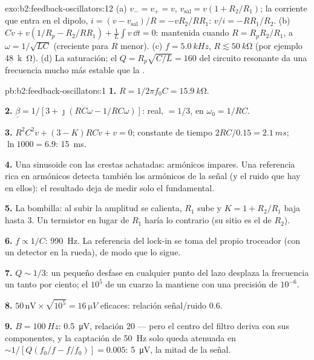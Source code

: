 \begin{solution}{exo:b2:feedback-oscillators:12}
(a) $v_- = v_+ = v$, $v_{\text{sal}} = v(1 + R_2/R_1)$; la corriente que entra en el
dipolo, $i = (v - v_{\text{sal}})/R = -vR_2/RR_1$: $v/i = -RR_1/R_2$. (b) $C\dot v +
v(1/R_p - R_2/RR_1) + \frac1L\int v\,\dd t = 0$: mantenida cuando $R = R_pR_2/R_1$,
a $\omega = 1/\sqrt{LC}$ (creciente para $R$ menor). (c) $f = \qty{5.0}{kHz}$, $R \lesssim
\qty{50}{k\ohm}$ (por ejemplo \qty{48}{k\ohm}). (d) La saturación; el $Q = R_p
\sqrt{C/L} = 160$ del circuito resonante da una frecuencia mucho más estable que la .
\end{solution}

\begin{solution}{pb:b2:feedback-oscillators:1}
\textbf{1.} $R = 1/2\pi f_0C = \qty{15.9}{k\ohm}$.

\textbf{2.} $\underline\beta = 1/[3 + \jmath(RC\omega - 1/RC\omega)]$: real, $= 1/3$, en
$\omega_0 = 1/RC$.

\textbf{3.} $R^2C^2\ddot v + (3 - K)RC\dot v + v = 0$; constante de tiempo $2RC/0.15 =
\qty{2.1}{ms}$; $\ln1000 = 6.9$: \qty{15}{ms}.

\textbf{4.} Una sinusoide con las crestas achatadas: armónicos impares.
Una referencia rica en armónicos detecta también los armónicos de la señal
(y el ruido que hay en ellos): el resultado deja de medir solo el
fundamental.

\textbf{5.} La bombilla: al subir la amplitud se calienta, $R_1$ sube y
$K = 1 + R_2/R_1$ baja hasta $3$. Un termistor en lugar de $R_1$ haría lo
contrario (su sitio es el de $R_2$).

\textbf{6.} $f \propto 1/C$: \qty{990}{Hz}. La referencia del lock-in se toma
del propio troceador (con un detector en la rueda), de modo que lo sigue.

\textbf{7.} $Q \sim 1/3$: un pequeño desfase en cualquier punto del lazo
desplaza la frecuencia un tanto por ciento; el $10^5$ de un cuarzo la
mantiene con una precisión de $10^{-6}$.

\textbf{8.} $50\,\text{nV} \times \sqrt{10^5} = \qty{16}{\micro V}$ eficaces: relación señal/ruido $0.6$.

\textbf{9.} $B = \qty{100}{Hz}$: \qty{0.5}{\micro V}, relación $20$ --- pero el
centro del filtro deriva con sus componentes, y la captación de \qty{50}{Hz}
solo queda atenuada en $\sim 1/[Q(f_0/f - f/f_0)] = 0.005$: \qty{5}{\micro V}, la mitad
de la señal.


\end{solution}
